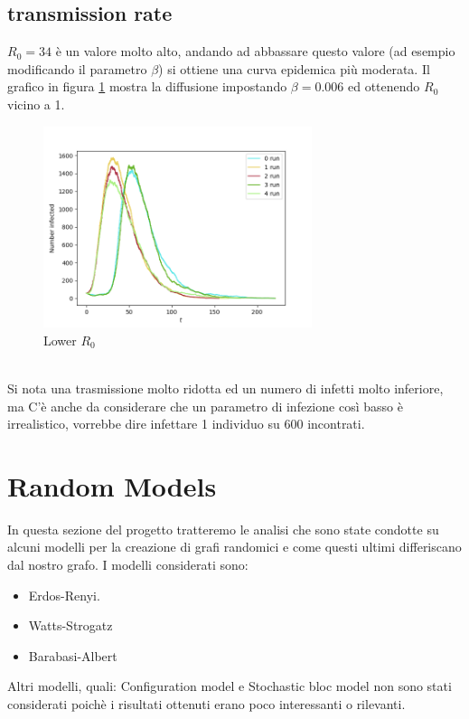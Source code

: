 \documentclass[a4paper]{article}
\begin{document}
\subsection{transmission rate}
$R_0 = 34$ è un valore molto alto, andando ad abbassare questo valore (ad esempio modificando il parametro $\beta$) si ottiene una curva epidemica più moderata.
Il grafico in figura \ref{FIG:transmission_rate_06_1_random} mostra la diffusione impostando $\beta = 0.006$ ed ottenendo $R_0$ vicino a 1.\\
\begin{figure}[!ht]
\centering
\includegraphics[width=0.7\textwidth]{transmission_rate_06_1_random.png}
\caption{Lower $R_0$} \label{FIG:transmission_rate_06_1_random}
\end{figure}\\
Si nota una trasmissione molto ridotta ed un numero di infetti molto inferiore, ma C'è anche da considerare che un parametro di infezione così basso è irrealistico, vorrebbe dire infettare 1 individuo su 600 incontrati.


\newpage
\section{Random Models}
In questa sezione del progetto tratteremo le analisi che sono state condotte su alcuni modelli per la creazione di grafi randomici e come questi ultimi differiscano dal nostro grafo.
I modelli considerati sono:
\begin{itemize}
	\item Erdos-Renyi.
	\item Watts-Strogatz
	\item Barabasi-Albert
\end{itemize}
Altri modelli, quali: Configuration	model e Stochastic bloc model non sono stati considerati poichè i risultati ottenuti erano poco interessanti o rilevanti.
\end{document}
